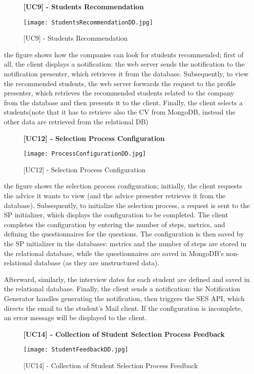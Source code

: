		
		\begin{figure}[H]
			\centering
			{\bfseries [UC9] - Students Recommendation}
			\caption{[UC9] - Students Recommendation}
			\texttt{[image: StudentsRecommendationDD.jpg]}
			
		\end{figure}
		
		the figure shows how the companies can look for students recommended; first of all, the client displays a notification: the web server sends the notification to the notification presenter, which retrieves it from the database. Subsequently, to view the recommended students, the web server forwards the request to the profile presenter, which retrieves the recommended students related to the company from the database and then presents it to the client. Finally, the client selects a students(note that it has to retrieve also the CV from MongoDB, instead the other data are retrieved from the relational DB)
		
		
		\begin{figure}[H]
			\centering
			{\bfseries [UC12] - Selection Process Configuration}
			\caption{[UC12] - Selection Process Configuration}
			\texttt{[image: ProcessConfigurationDD.jpg]}
			
		\end{figure}
		
		
		the figure shows the selection process configuration; initially, the client requests the advice it wants to view (and the advice presenter retrieves it from the database). Subsequently, to initialize the selection process, a request is sent to the SP initializer, which displays the configuration to be completed. The client completes the configuration by entering the number of steps, metrics, and defining the questionnaires for the questions. The configuration is then saved by the SP initializer in the databases: metrics and the number of steps are stored in the relational database, while the questionnaires are saved in MongoDB’s non-relational database (as they are unstructured data).
		
		Afterward, similarly, the interview dates for each student are defined and saved in the relational database. Finally, the client sends a notification: the Notification Generator handles generating the notification, then triggers the SES API, which directs the email to the student's Mail client. If the configuration is incomplete, an error message will be displayed to the client.
		
		
		\begin{figure}[H]
			\centering
			{\bfseries [UC14] - Collection of Student Selection Process Feedback}
			\caption{[UC14] - Collection of Student Selection Process Feedback}
			\texttt{[image: StudentFeedbackDD.jpg]}
		\end{figure}
		
